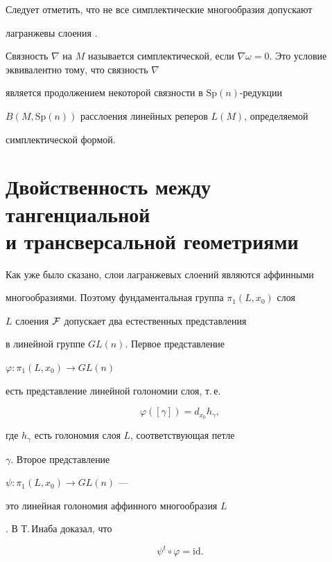 Следует отметить, что не все симплектические многообразия допускают


лагранжевы слоения \cite{GO}.





Связность $\nabla$ на $M$ называется симплектической, если $\nabla


\omega = 0$. Это условие эквивалентно тому, что связность $\nabla$


является продолжением некоторой связности в $\text{Sp}(n)$-редукции


$B(M,\text{Sp}(n))$ расслоения линейных реперов $L(M)$, определяемой


симплектической формой.





\section{Двойственность между тангенциальной\protect\\


и трансверсальной геометриями}





Как уже было сказано, слои лагранжевых слоений являются аффинными


многообразиями. Поэтому фундаментальная группа ${\pi}_1(L,x_0)$ слоя


$L$ слоения $\cal F$ допускает два естественных представления


в линейной группе $GL(n)$. Первое представление


$\varphi : {\pi}_1(L,x_0) \rightarrow GL(n)$


есть представление линейной голономии слоя, т.\,е.


$$


\varphi ([{\gamma}]) = d_{x_0}h_{\gamma},


$$


где $h_{\gamma}$ есть голономия слоя $L$, соответствующая петле


$\gamma$. Второе представление


$\psi : {\pi}_1(L,x_0) \rightarrow GL(n)$ ---


это линейная голономия аффинного многообразия $L$


\cite{FGH1}. В \cite{IN} Т.\,Инаба доказал, что


\begin{equation}


\psi^t \circ \varphi = \text{id}. \tag{$*$}


\end{equation}





